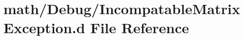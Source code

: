 \hypertarget{_incompatable_matrix_exception_8d}{\section{math/\+Debug/\+Incompatable\+Matrix\+Exception.d File Reference}
\label{_incompatable_matrix_exception_8d}
}
